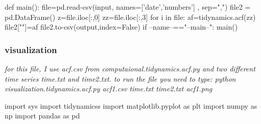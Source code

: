 \documentclass[12pt, a4paper, twoside]{report}
\begin{document}
def main():\newline
\hspace*{10mm}    file=pd.read-csv(input, names=['date','numbers'] , sep=",") \newline
\hspace*{10mm}    file2 = pd.DataFrame()\newline
\hspace*{10mm}    z=file.iloc[:,0]\newline
\hspace*{10mm}    zz=file.iloc[:,3]\newline\newline
\hspace*{10mm}    for i in file:\newline
\hspace*{20mm}        af=tidynamics.acf(zz)\newline
\hspace*{10mm}    file2[""]=af\newline
\hspace*{10mm}   file2.to-csv(output,index=False) \newline
if --name--=="--main--":\newline
\hspace*{10mm}    main()\par






\subsubsection{visualization}
\textit{for this file, I use acf.csv from computaional.tidynamics.acf.py and two different time series time.txt and time2.txt.\newline
to run the file you need to type: python visualization.tidynamics.acf.py acf1.csv time.txt time2.txt acf1.png}


import sys\newline
import tidynamicss\newline
import matplotlib.pyplot as plt\newline
import numpy as np\newline
import pandas as pd\newline
\end{document}
